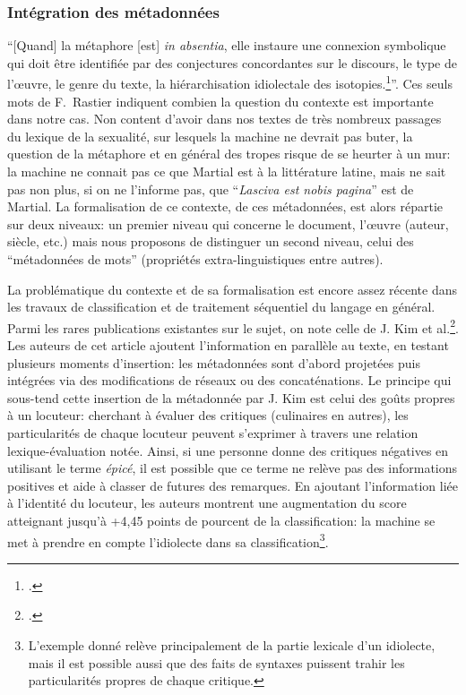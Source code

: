 
\subsubsection{Intégration des métadonnées}
\label{chap4:encodage:metadonnees}

\enquote{[Quand] la métaphore [est] \textit{in absentia}, elle instaure une connexion symbolique qui doit être identifiée par des conjectures concordantes sur le discours, le type de l'œuvre, le genre du texte, la hiérarchisation idiolectale des isotopies.\footcite[p. 98]{rastier_tropes_1994}}. Ces seuls mots de F.~Rastier indiquent combien la question du contexte est importante dans notre cas. Non content d'avoir dans nos textes de très nombreux passages du lexique de la sexualité, sur lesquels la machine ne devrait pas buter, la question de la métaphore et en général des tropes risque de se heurter à un mur: la machine ne connait pas ce que Martial est à la littérature latine, mais ne sait pas non plus, si on ne l'informe pas, que \enquote{\textit{Lasciva est nobis pagina}} est de Martial. La formalisation de ce contexte, de ces métadonnées, est alors répartie sur deux niveaux: un premier niveau qui concerne le document, l'œuvre (auteur, siècle, etc.) mais nous proposons de distinguer un second niveau, celui des \enquote{métadonnées de mots} (propriétés extra-linguistiques entre autres).

La problématique du contexte et de sa formalisation est encore assez récente dans les travaux de classification et de traitement séquentiel du langage en général. Parmi les rares publications existantes sur le sujet, on note celle de J. Kim et al.\footcite{kim_categorical_2019}. Les auteurs de cet article ajoutent l'information en parallèle au texte, en testant plusieurs moments d'insertion: les métadonnées sont d'abord projetées puis intégrées via des modifications de réseaux ou des concaténations. Le principe qui sous-tend cette insertion de la métadonnée par J. Kim est celui des goûts propres à un locuteur: cherchant à évaluer des critiques (culinaires en autres), les particularités de chaque locuteur peuvent s'exprimer à travers une relation lexique-évaluation notée. Ainsi, si une personne donne des critiques négatives en utilisant le terme \textit{épicé}, il est possible que ce terme ne relève pas des informations positives et aide à classer de futures des remarques. En ajoutant l'information liée à l'identité du locuteur, les auteurs montrent une augmentation du score atteignant jusqu'à +4,45 points de pourcent de la classification: la machine se met à prendre en compte l'idiolecte dans sa classification\footnote{L'exemple donné relève principalement de la partie lexicale d'un idiolecte, mais il est possible aussi que des faits de syntaxes puissent trahir les particularités propres de chaque critique.}.

